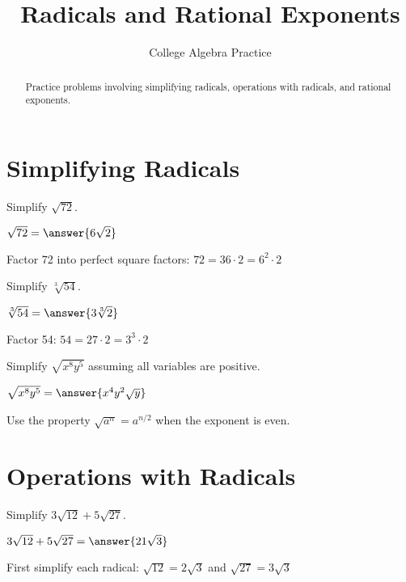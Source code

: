 \documentclass{ximera}
\title{Radicals and Rational Exponents}
\author{College Algebra Practice}
\begin{document}
\begin{abstract}
Practice problems involving simplifying radicals, operations with radicals, and rational exponents.
\end{abstract}
\maketitle

\section{Simplifying Radicals}

\begin{problem}
Simplify $\sqrt{72}$.

$\sqrt{72} = \answer{6\sqrt{2}}$

\begin{hint}
Factor 72 into perfect square factors: $72 = 36 \cdot 2 = 6^2 \cdot 2$
\end{hint}
\end{problem}

\begin{problem}
Simplify $\sqrt[3]{54}$.

$\sqrt[3]{54} = \answer{3\sqrt[3]{2}}$

\begin{hint}
Factor 54: $54 = 27 \cdot 2 = 3^3 \cdot 2$
\end{hint}
\end{problem}

\begin{problem}
Simplify $\sqrt{x^8y^5}$ assuming all variables are positive.

$\sqrt{x^8y^5} = \answer{x^4y^2\sqrt{y}}$

\begin{hint}
Use the property $\sqrt{a^n} = a^{n/2}$ when the exponent is even.
\end{hint}
\end{problem}

\section{Operations with Radicals}

\begin{problem}
Simplify $3\sqrt{12} + 5\sqrt{27}$.

$3\sqrt{12} + 5\sqrt{27} = \answer{21\sqrt{3}}$

\begin{hint}
First simplify each radical: $\sqrt{12} = 2\sqrt{3}$ and $\sqrt{27} = 3\sqrt{3}$
\end{hint}
\end{problem}
\end{document}
